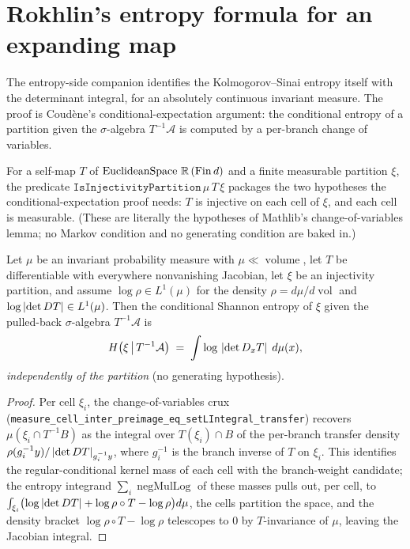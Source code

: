\section{Rokhlin's entropy formula for an expanding map}

The entropy-side companion identifies the Kolmogorov--Sinai entropy itself with the determinant
integral, for an absolutely continuous invariant measure. The proof is Coud\`ene's
conditional-expectation argument: the conditional entropy of a partition given the
\(\sigma\)-algebra \(T^{-1}\mathcal{A}\) is computed by a per-branch change of variables.

\begin{definition}\label{IsInjectivityPartition}
  \leanok
  For a self-map \(T\) of \(\operatorname{EuclideanSpace}\,\mathbb{R}\,(\operatorname{Fin} d)\) and a finite measurable
  partition \(\xi\), the predicate \(\texttt{IsInjectivityPartition}\,\mu\,T\,\xi\) packages the
  two hypotheses the conditional-expectation proof needs: \(T\) is injective on each cell of
  \(\xi\), and each cell is measurable. (These are literally the hypotheses of Mathlib's
  change-of-variables lemma; no Markov condition and no generating condition are baked in.)
\end{definition}

\begin{theorem}\label{condEntropy_comap_eq_integral_log_abs_det}
  \leanok
  Let \(\mu\) be an invariant probability measure with \(\mu\ll\operatorname{volume}\), let \(T\)
  be differentiable with everywhere nonvanishing Jacobian, let \(\xi\) be an injectivity
  partition, and assume \(\log\rho\in L^1(\mu)\) for the density \(\rho = d\mu/d\operatorname{vol}\)
  and \(\log\left\lvert \det D T \right\rvert\in L^1(\mu)\). Then the conditional Shannon entropy of \(\xi\) given
  the pulled-back \(\sigma\)-algebra \(T^{-1}\mathcal{A}\) is
  \[
    H\bigl(\xi \,\big|\, T^{-1}\mathcal{A}\bigr) \;=\; \int \log\,\left\lvert \det D_xT \right\rvert\;d\mu(x),
  \]
  \emph{independently of the partition} (no generating hypothesis).
\end{theorem}
\begin{proof}\leanok
  Per cell \(\xi_i\), the change-of-variables crux
  (\texttt{measure\_cell\_inter\_preimage\_eq\_setLIntegral\_transfer})
  recovers \(\mu(\xi_i\cap T^{-1}B)\) as the integral over \(T(\xi_i)\cap B\) of the per-branch
  transfer density \(\rho(g_i^{-1}y)/\left\lvert \det DT \right\rvert_{g_i^{-1}y}\), where \(g_i^{-1}\) is the branch
  inverse of \(T\) on \(\xi_i\). This identifies the regular-conditional kernel mass of each cell
  with the branch-weight candidate; the entropy integrand
  \(\sum_i\operatorname{negMulLog}\) of these masses pulls out, per cell, to
  \(\int_{\xi_i}\bigl(\log\left\lvert \det DT \right\rvert + \log\rho\circ T - \log\rho\bigr)d\mu\), the cells
  partition the space, and the density bracket \(\log\rho\circ T - \log\rho\) telescopes to \(0\)
  by \(T\)-invariance of \(\mu\), leaving the Jacobian integral.
\end{proof}


